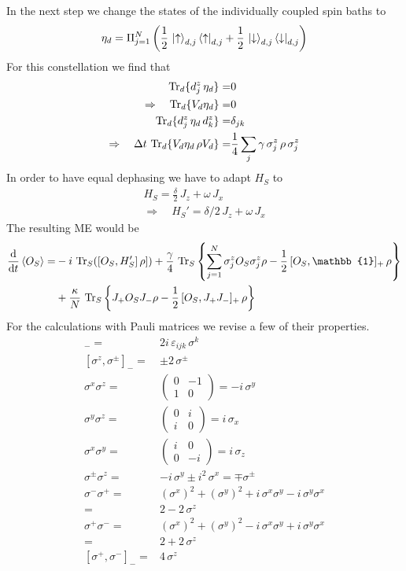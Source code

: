 \documentclass{article}
\begin{document}
In the next step we change the states of the individually coupled spin baths to
\begin{align*}
    \eta_d=\Pi_{j=1}^N\left(\frac{1}{2}\,\ket{\uparrow}_{d,j}\bra{\uparrow}_{d,j}+\frac{1}{2}\,\ket{\downarrow}_{d,j}\bra{\downarrow}_{d,j}\right)
\end{align*}
For this constellation we find that
\begin{align*}
    \operatorname{Tr}_d\{d_j^z\,\eta_d\}=&0\\
    \Rightarrow\quad\operatorname{Tr}_d\{V_d\eta_d\}=&0\\
    \operatorname{Tr}_d\{d_j^z\,\eta_d\,d_k^z\}=&\delta_{jk}\\
    \Rightarrow\quad\Delta t\,\operatorname{Tr}_d\{V_d\eta_d\,\rho V_d\}=&\frac{1}{4}\sum_{j}\gamma\,\sigma_j^z\,\rho\,\sigma_j^z
\end{align*}
In order to have equal dephasing we have to adapt $H_S$ to
\begin{align*}
    H_S=\frac{\delta}{2}\,J_z+\omega\,J_x\\
    \Rightarrow\quad H_S'=\delta/2\,J_z+\omega\,J_x
\end{align*}
The resulting ME would be
\begin{align*}
    \dt\braket{O_S}=&-i\,\operatorname{Tr}_S([O_S,H_S']\,\rho])+\frac{\gamma}{4}\,\Trs{\sum_{j=1}^N \sigma_j^z O_S \sigma_j^z \rho-\half\,[O_S,\mathbb{1}]_+\,\rho}\\
    &+\frac{\kappa}{N}\,\Trs{J_+ O_S J_- \rho-\half\,[O_S,J_+ J_-]_+\,\rho}
\end{align*}
For the calculations with Pauli matrices we revise a few of their properties.
\begin{align*}
    [\sigma^i,\sigma^j]_-=&2i\,\varepsilon_{ijk}\,\sigma^k\\
    [\sigma^z,\sigma^\pm]_-=&\pm2\,\sigma^\pm\\
    \sigma^x\sigma^z=&\left( \begin{array}{cc}
         0 & -1  \\
         1& 0
    \end{array}\right)=-i\,\sigma^y\\
    \sigma^y\sigma^z=&\left( \begin{array}{cc}
         0 & i  \\
         i& 0
    \end{array}\right)=i\,\sigma_x\\
    \sigma^x\sigma^y=&\left( \begin{array}{cc}
         i & 0  \\
         0 & -i
    \end{array}\right)=i\,\sigma_z\\
    \sigma^\pm\sigma^z=&-i\,\sigma^y\pm i^2\,\sigma^x=\mp\sigma^\pm\\
    \sigma^-\sigma^+=&(\sigma^x)^2+(\sigma^y)^2+i\,\sigma^x\sigma^y-i\,\sigma^y\sigma^x\\
    =&2-2\,\sigma^z\\
    \sigma^+\sigma^-=&(\sigma^x)^2+(\sigma^y)^2-i\,\sigma^x\sigma^y+i\,\sigma^y\sigma^x\\
    =&2+2\,\sigma^z\\
    [\sigma^+,\sigma^-]_-=&4\,\sigma^z
\end{align*}
\end{document}
